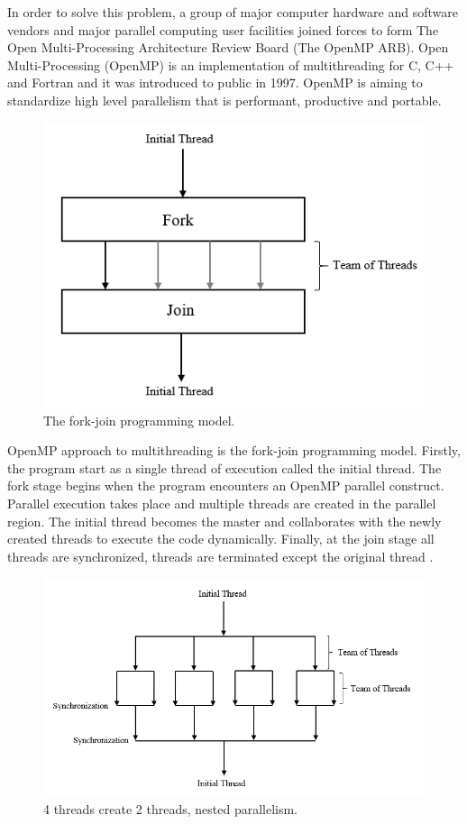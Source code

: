 \documentclass[12pt, oneside]{book}
\theoremstyle{plain}
\theoremstyle{definition}
\begin{document}
In order to solve this problem, a group of major computer hardware and software vendors and major parallel computing user facilities joined forces to form The Open Multi-Processing Architecture Review Board (The OpenMP ARB)\cite{openmpfaq}. Open Multi-Processing (OpenMP) is an implementation of multithreading for C, C++ and Fortran and it was introduced to public in 1997. OpenMP is aiming to standardize high level parallelism that is performant, productive and portable.

\begin{figure}[!htb]
    \centering
        \includegraphics[scale=0.5]{openmp.png}
    \caption{The fork-join programming model.}
\end{figure}

 OpenMP approach to multithreading is the fork-join programming model. Firstly, the program start as a single thread of execution called the initial thread. The fork stage begins when the program encounters an OpenMP parallel construct. Parallel execution takes place and multiple threads are created in the parallel region. The initial thread becomes the master and collaborates with the newly created threads to execute the code dynamically. Finally, at the join stage all threads are synchronized, threads are terminated except the original thread \cite{openmp}.

\begin{figure}[!htb]
    \centering
        \includegraphics[scale=0.5]{openmpnested.png}
    \caption{4 threads create 2 threads, nested parallelism.}
\end{figure}
\end{document}

